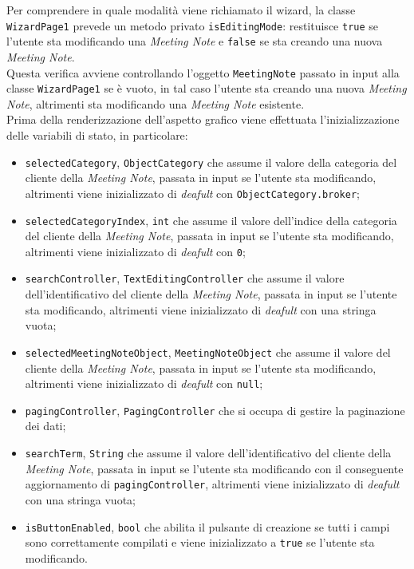Per comprendere in quale modalità viene richiamato il \gls{wizard}\glsoccur, la classe \lstinline{WizardPage1} prevede un metodo privato \lstinline{isEditingMode}: restituisce \lstinline{true} se l'utente sta modificando una \emph{Meeting Note} e \lstinline{false} se sta creando una nuova \emph{Meeting Note}. \\
Questa verifica avviene controllando l'oggetto \lstinline{MeetingNote} passato in input alla classe \lstinline{WizardPage1} se è vuoto, in tal caso l'utente sta creando una nuova \emph{Meeting Note}, altrimenti sta modificando una \emph{Meeting Note} esistente. \\
Prima della renderizzazione dell'aspetto grafico viene effettuata l'inizializzazione delle variabili di stato, in particolare:
\begin{itemize}
    \item \lstinline{selectedCategory}, \lstinline{ObjectCategory} che assume il valore della categoria del cliente della \emph{Meeting Note}, passata in input se l'utente sta modificando, altrimenti viene inizializzato di \emph{deafult} con \lstinline{ObjectCategory.broker};
    \item \lstinline{selectedCategoryIndex}, \lstinline{int} che assume il valore dell'indice della categoria del cliente della \emph{Meeting Note}, passata in input se l'utente sta modificando, altrimenti viene inizializzato di \emph{deafult} con \lstinline{0};
    \item \lstinline{searchController}, \lstinline{TextEditingController} che assume il valore dell'identificativo del cliente della \emph{Meeting Note}, passata in input se l'utente sta modificando, altrimenti viene inizializzato di \emph{deafult} con una stringa vuota;
    \item \lstinline{selectedMeetingNoteObject}, \lstinline{MeetingNoteObject} che assume il valore del cliente della \emph{Meeting Note}, passata in input se l'utente sta modificando, altrimenti viene inizializzato di \emph{deafult} con \lstinline{null};
    \item \lstinline{pagingController}, \lstinline{PagingController} che si occupa di gestire la paginazione dei dati;
    \item \lstinline{searchTerm}, \lstinline{String} che assume il valore dell'identificativo del cliente della \emph{Meeting Note}, passata in input se l'utente sta modificando con il conseguente aggiornamento di \lstinline{pagingController}, altrimenti viene inizializzato di \emph{deafult} con una stringa vuota;
    \item \lstinline{isButtonEnabled}, \lstinline{bool} che abilita il pulsante di creazione se tutti i campi sono correttamente compilati e viene inizializzato a \lstinline{true} se l'utente sta modificando.
\end{itemize}
